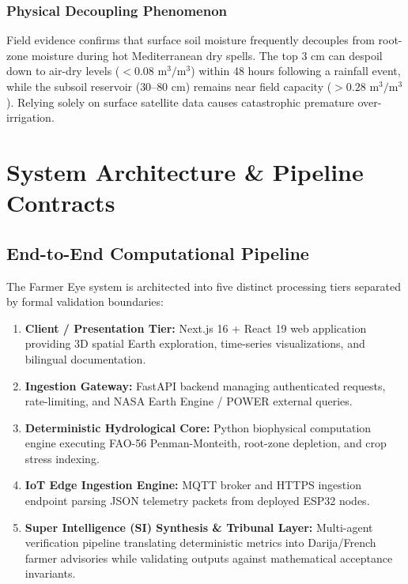 \documentclass[11pt,a4paper,oneside]{report}
\begin{document}
\subsection{Physical Decoupling Phenomenon}
Field evidence confirms that surface soil moisture frequently decouples from root-zone moisture during hot Mediterranean dry spells. The top $3\text{ cm}$ can despoil down to air-dry levels ($< 0.08\text{ m}^3/\text{m}^3$) within 48 hours following a rainfall event, while the subsoil reservoir ($30–80\text{ cm}$) remains near field capacity ($> 0.28\text{ m}^3/\text{m}^3$). Relying solely on surface satellite data causes catastrophic premature over-irrigation.

\chapter{System Architecture \& Pipeline Contracts}

\section{End-to-End Computational Pipeline}
The Farmer Eye system is architected into five distinct processing tiers separated by formal validation boundaries:
\begin{enumerate}
    \item \textbf{Client / Presentation Tier:} Next.js 16 + React 19 web application providing 3D spatial Earth exploration, time-series visualizations, and bilingual documentation.
    \item \textbf{Ingestion Gateway:} FastAPI backend managing authenticated requests, rate-limiting, and NASA Earth Engine / POWER external queries.
    \item \textbf{Deterministic Hydrological Core:} Python biophysical computation engine executing FAO-56 Penman-Monteith, root-zone depletion, and crop stress indexing.
    \item \textbf{IoT Edge Ingestion Engine:} MQTT broker and HTTPS ingestion endpoint parsing JSON telemetry packets from deployed ESP32 nodes.
    \item \textbf{Super Intelligence (SI) Synthesis \& Tribunal Layer:} Multi-agent verification pipeline translating deterministic metrics into Darija/French farmer advisories while validating outputs against mathematical acceptance invariants.
\end{enumerate}
\end{document}
